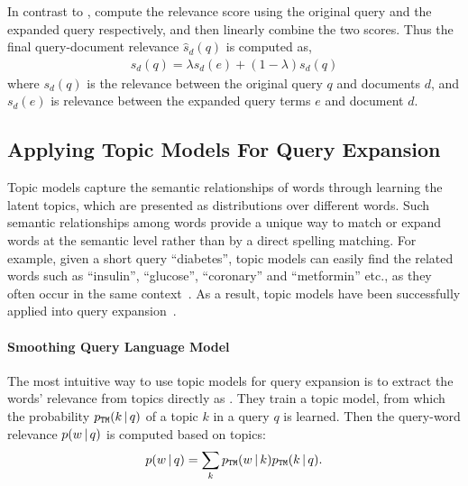 In contrast to \citet{zhai-01b}, \citet{Lavrenko-2001} compute
the relevance score using the original query and the expanded query
respectively, and then linearly combine the two scores. Thus the final
query-document relevance $\hat{s}_d(q)$ is computed as,
\begin{align}
\label{eq:rm_qe_comb}
\hat{s}_d(q) = \lambda s_d(e) + (1-\lambda)s_d(q)
\end{align}
where $s_d(q)$ is the relevance between the original query $q$ and
documents $d$, and $s_d(e)$ is relevance between the expanded query
terms $e$ and document $d$.

\subsection{Applying Topic Models For Query Expansion}

Topic models capture the semantic relationships of words through
learning the latent topics, which are presented as distributions over
different words. Such semantic relationships among words provide a
unique way to match or expand words at the semantic level rather than
by a direct spelling matching. For example, given a short query ``diabetes'',
topic models can easily find the related words such as
``insulin'', ``glucose'', ``coronary'' and ``metformin'' etc., 
as they often occur in the same context~\citep{Zeng-2012}. 
As a result, topic models have been
successfully applied into query expansion~\citep{Yi-2009,Park-2009,Zeng-2012}.

\paragraph{Smoothing Query Language Model}


The most intuitive way to use topic models for query expansion is to
extract the words' relevance from topics directly as
\citet{Yi-2009}. They train a topic model, from which the probability
$p_{\texttt{TM}}(k \, | \, q)$ of a topic $k$ in a query $q$ is learned. Then
the query-word relevance $p(w \, | \, q)$ is computed based on topics:
\begin{align}
\label{eq:query_word_prob}
p(w \, | \, q) = \sum_k p_{\texttt{TM}}(w \, | \, k) p_{\texttt{TM}}(k \, | \, q).
\end{align}

